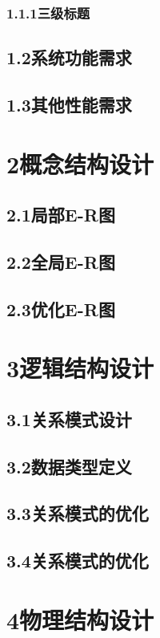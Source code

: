 \documentclass{zjut-report}
\begin{document}
\subsection{1.1.1\quad 三级标题}

\section{1.2\quad 系统功能需求}
\section{1.3\quad 其他性能需求}

\chapter{2\quad 概念结构设计}
\section{2.1\quad 局部E-R图}
\section{2.2\quad 全局E-R图}
\section{2.3\quad 优化E-R图}

\chapter{3\quad 逻辑结构设计}
\section{3.1\quad 关系模式设计}
\section{3.2\quad 数据类型定义}
\section{3.3\quad 关系模式的优化}
\section{3.4\quad 关系模式的优化}

\chapter{4\quad 物理结构设计}
\end{document}
